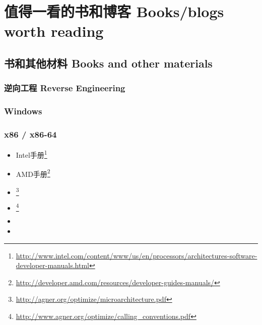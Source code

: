 \documentclass[UTF8,nofonts]{ctexart}
\begin{document}

\chapter{值得一看的书和博客 Books/blogs worth reading}

\section{书和其他材料 Books and other materials}

\subsection{逆向工程 Reverse Engineering}




\subsection{Windows}



\subsection{\CCpp}



\subsection{x86 / x86-64}

\label{x86_manuals}
\begin{itemize}
\item Intel手册\footnote{\AlsoAvailableAs \url{http://www.intel.com/content/www/us/en/processors/architectures-software-developer-manuals.html}}

\item AMD手册\footnote{\AlsoAvailableAs \url{http://developer.amd.com/resources/developer-guides-manuals/}}

\item \AgnerFog{}\footnote{\AlsoAvailableAs \url{http://agner.org/optimize/microarchitecture.pdf}}

\item \AgnerFogCC{}\footnote{\AlsoAvailableAs \url{http://www.agner.org/optimize/calling_conventions.pdf}}

\item \IntelOptimization

\item \AMDOptimization
\end{itemize}
\end{document}
